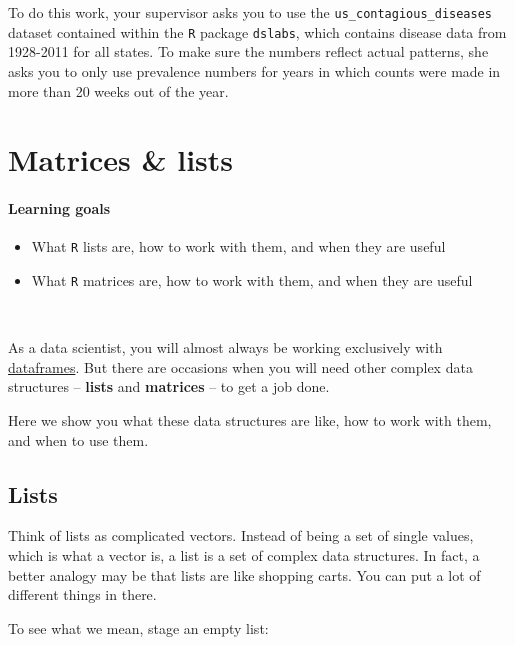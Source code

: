 \documentclass[
]{book}
\providecommand{\tightlist}{%
  \setlength{\itemsep}{0pt}\setlength{\parskip}{0pt}}
\begin{document}
To do this work, your supervisor asks you to use the \texttt{us\_contagious\_diseases} dataset contained within the \texttt{R} package \texttt{dslabs}, which contains disease data from 1928-2011 for all states. To make sure the numbers reflect actual patterns, she asks you to only use prevalence numbers for years in which counts were made in more than 20 weeks out of the year.

\hypertarget{matrices-lists}{%
\chapter{Matrices \& lists}\label{matrices-lists}}

\hypertarget{learning-goals-26}{%
\subsubsection*{Learning goals}\label{learning-goals-26}}

\begin{itemize}
\tightlist
\item
  What \texttt{R} lists are, how to work with them, and when they are useful\\
\item
  What \texttt{R} matrices are, how to work with them, and when they are useful
\end{itemize}

~

As a data scientist, you will almost always be working exclusively with \protect\hyperlink{dataframes}{dataframes}. But there are occasions when you will need other complex data structures -- \textbf{lists} and \textbf{matrices} -- to get a job done.

Here we show you what these data structures are like, how to work with them, and when to use them.

\hypertarget{lists}{%
\section*{Lists}\label{lists}}

Think of lists as complicated vectors. Instead of being a set of single values, which is what a vector is, a list is a set of complex data structures. In fact, a better analogy may be that lists are like shopping carts. You can put a lot of different things in there.

To see what we mean, stage an empty list:
\end{document}
